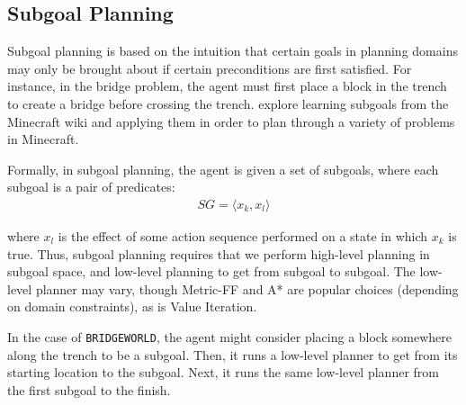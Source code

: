\documentclass[]{article}
\begin{document}



\subsection{Subgoal Planning}
\label{sec:subgoals}

Subgoal planning is based on the intuition that certain goals in
planning domains may only be brought about if certain preconditions
are first satisfied. For instance, in the bridge problem, the agent must
first place a block in the trench to create a bridge before crossing
the trench.  \citet{branavan12a} explore learning subgoals from the
Minecraft wiki and applying them in order to plan through a variety of
problems in Minecraft.

Formally, in subgoal planning, the agent is given a set of subgoals, where each subgoal is a pair of predicates:
\begin{align}
SG = \langle x_k, x_l \rangle
\end{align}

where $x_l$ is the effect of some action sequence performed on 
a state in which $x_k$ is true. Thus, subgoal planning requires 
that we perform high-level planning in subgoal space, and low-level 
planning to get from subgoal to subgoal. The low-level planner may vary, though
Metric-FF and A* are popular choices (depending on domain constraints), as is Value Iteration.

In the case of \texttt{BRIDGEWORLD}, the agent might consider placing
a block somewhere along the trench to be a subgoal. Then, it runs
a low-level planner to get from its starting location to the subgoal.
Next, it runs the same low-level planner from the first subgoal to the finish.

\end{document}
